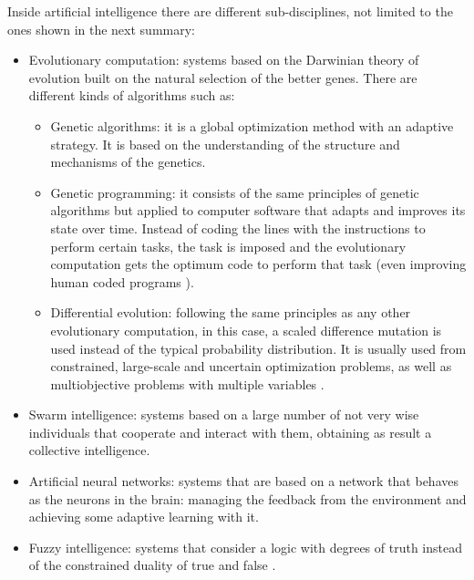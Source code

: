     Inside artificial intelligence there are different sub-disciplines, not limited to the ones shown in the next summary: 
    \begin{itemize}
        \item Evolutionary computation: systems based on the Darwinian theory of evolution built on the natural selection of the better genes. There are different kinds of algorithms such as:
            \begin{itemize}
                \item Genetic algorithms: it is a global optimization method with an adaptive strategy. It is based on the understanding of the structure and mechanisms of the genetics.
                \item Genetic programming: it consists of the same principles of genetic algorithms but applied to computer software that adapts and improves its state over time. Instead of coding the lines with the instructions to perform certain tasks, the task is imposed and the evolutionary computation gets the optimum code to perform that task \cite{koza2006genetic} (even improving human coded programs \cite{cramer1985representation}).
                \item Differential evolution: following the same principles as any other evolutionary computation, in this case, a scaled difference mutation is used instead of the typical probability distribution. It is usually used from constrained, large-scale and uncertain optimization problems, as well as multiobjective problems with multiple variables \cite{das2011differential}.
            \end{itemize}
        \item Swarm intelligence: systems based on a large number of not very wise individuals that cooperate and interact with them, obtaining as result a collective intelligence.
        \newpage
        \item Artificial neural networks: systems that are based on a network that behaves as the neurons in the brain: managing the feedback from the environment and achieving some adaptive learning with it.
        \item Fuzzy intelligence: systems that consider a logic with degrees of truth instead of the constrained duality of true and false \cite{klir1996fuzzy}.
    \end{itemize}
    
